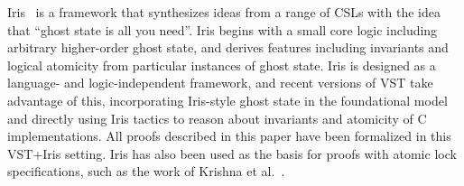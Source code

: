 \documentclass[runningheads]{llncs}
\begin{document}
Iris~\cite{iris} is a framework that synthesizes ideas from a range of CSLs with the idea that ``ghost state is all you need''. Iris begins with a small core logic including arbitrary higher-order ghost state, and derives features including invariants and logical atomicity from particular instances of ghost state. Iris is designed as a language- and logic-independent framework, and recent versions of VST take advantage of this, incorporating Iris-style ghost state in the foundational model and directly using Iris tactics to reason about invariants and atomicity of C implementations. All proofs described in this paper have been formalized in this VST+Iris setting. Iris has also been used as the basis for proofs with atomic lock specifications, such as the work of Krishna et al.~\cite{templates}.
\end{document}
